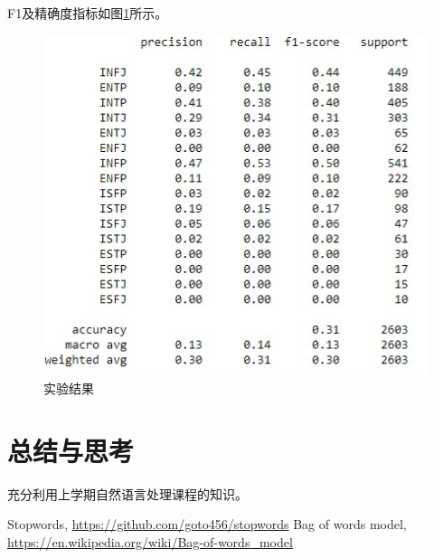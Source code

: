 \documentclass[logo,reportComp]{thesis}
\begin{document}
F1及精确度指标如图\ref{fig:f1}所示。
\begin{figure}[H]
\centering
\includegraphics[width=0.9\linewidth]{fig/report.jpg}
\caption{实验结果}
\label{fig:f1}
\end{figure}

\section{总结与思考}
充分利用上学期自然语言处理课程的知识。

\begin{thebibliography}{99}
 Stopwords, \url{https://github.com/goto456/stopwords}
 Bag of words model, \url{https://en.wikipedia.org/wiki/Bag-of-words_model}
\end{thebibliography}
\end{document}
